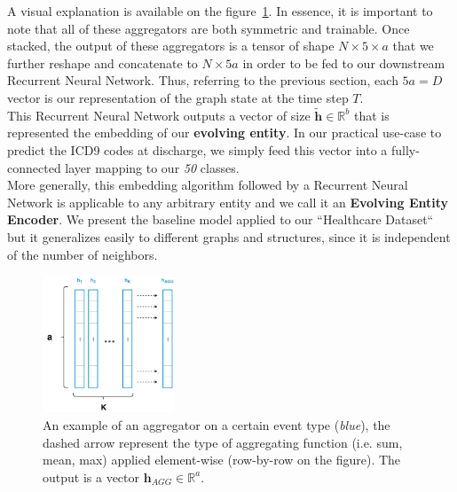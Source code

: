 A visual explanation is available on the figure~\ref{fig:agg-example}. In essence, it is important to note that all of these aggregators are both symmetric and trainable. Once stacked, the output of these aggregators is a tensor of shape $N \times 5 \times a$ that we further reshape and concatenate to $N \times 5a$ in order to be fed to our downstream Recurrent Neural Network. Thus, referring to the previous section, each $5a=D$ vector is our representation of the graph state at the time step $T$. \\

This Recurrent Neural Network outputs a vector of size $\bm{\tilde{h}} \in \mathbb{R}^{b}$ that is represented the embedding of our \textbf{evolving entity}. In our practical use-case to predict the ICD9 codes at discharge, we simply feed this vector into a fully-connected layer mapping to our \emph{50} classes.\\

More generally, this embedding algorithm followed by a Recurrent Neural Network is applicable to any arbitrary entity and we call it an \textbf{Evolving Entity Encoder}. We present the baseline model applied to our ``Healthcare Dataset`` but it generalizes easily to different graphs and structures, since it is independent of the number of neighbors.

\begin{figure}[h]
 \centering
 \includegraphics[width=0.35\textwidth]{figures/agg-example.pdf}
 \caption{An example of an aggregator on a certain event type (\textit{blue}), the dashed arrow represent the type of aggregating function (i.e. sum, mean, max) applied element-wise (row-by-row on the figure). The output is a vector $\bm{h}_{AGG} \in \mathbb{R}^{a}$.}
 \label{fig:agg-example}
\end{figure}

